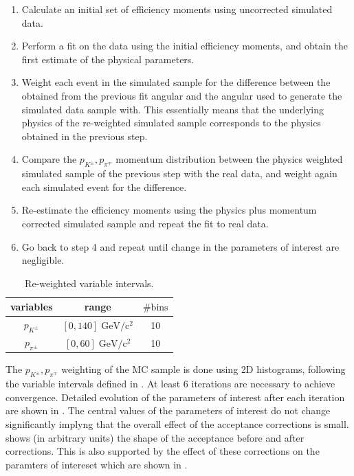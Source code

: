 \begin{enumerate}
\item Calculate an initial set of efficiency moments using uncorrected \BsJpsiKst simulated data.
\item Perform a fit on the \BsJpsiKst data using the initial efficiency moments, and obtain the first estimate of the physical parameters.
\item Weight each event in the simulated sample for the difference between the obtained from the previous fit angular \pdf and the angular \pdf used to
      generate the simulated data sample with.
      This essentially means that the underlying physics of the re-weighted simulated  sample corresponds to the physics obtained in the previous step.
\item Compare the $p_{K^{\pm}},p_{\pi^{\mp}}$ momentum distribution between the physics weighted simulated sample of the previous step with the
      real data, and weight again each simulated event for the difference.
\item Re-estimate the efficiency moments using the physics plus momentum corrected \BsJpsiKst simulated sample and repeat the fit to \BsJpsiKst real data.
\item Go back to step 4 and repeat until change in the parameters of interest are negligible.
\end{enumerate}

\begin{table}[!h]
  \center
  \begin{tabular}{c c c}
    \hline
     variables & range & $\# \text{bins}$ \\
    \hline
    $p_{K^{\pm}}$    &  $[0,140]    \;  \text{GeV}/\text{c}^2$  & 10      \\
    $p_{\pi^{\pm}}$  &  $[0,60]      \;  \text{GeV}/\text{c}^2$  & 10      \\
    \hline
  \end{tabular}
  \caption{\small Re-weighted variable intervals.}
  \label{angAccBinning}
\end{table}

The $p_{K^{\pm}},p_{\pi^{\mp}}$ weighting of the MC sample is done using 2D histograms, following the variable intervals defined in .
At least 6 iterations are necessary to achieve convergence. Detailed evolution of the parameters of interest after each iteration are shown in
. The central values of the parameters of interest do not change significantly implyng that the overall effect of the
acceptance corrections is small.  shows (in arbitrary units) the shape of the acceptance before and after corrections.
This is also supported by the effect of these corrections on the paramters of intereset which are shown in .

